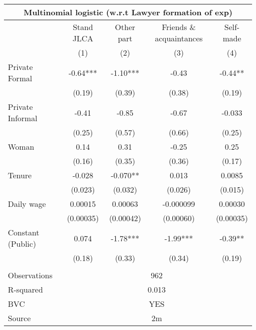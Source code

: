 \begin{tabular}{lcccc}
\multicolumn{5}{c}{Multinomial logistic (w.r.t Lawyer formation of exp)} \\
\midrule
      & Stand JLCA & Other part & Friends \& acquaintances & Self-made \\
\midrule
\midrule
      & (1)   & (2)   & (3)   & (4) \\
\midrule
\midrule
Private Formal & -0.64*** & -1.10*** & -0.43 & -0.44** \\
      & (0.19) & (0.39) & (0.38) & (0.19) \\
Private Informal & -0.41 & -0.85 & -0.67 & -0.033 \\
      & (0.25) & (0.57) & (0.66) & (0.25) \\
Woman  & 0.14  & 0.31  & -0.25 & 0.25 \\
      & (0.16) & (0.35) & (0.36) & (0.17) \\
Tenure & -0.028 & -0.070** & 0.013 & 0.0085 \\
      & (0.023) & (0.032) & (0.026) & (0.015) \\
Daily wage & 0.00015 & 0.00063 & -0.000099 & 0.00030 \\
      & (0.00035) & (0.00042) & (0.00060) & (0.00035) \\
Constant (Public) & 0.074 & -1.78*** & -1.99*** & -0.39** \\
      & (0.18) & (0.33) & (0.34) & (0.19) \\
      &       &       &       &  \\
\midrule
Observations & \multicolumn{4}{c}{962} \\
R-squared & \multicolumn{4}{c}{0.013} \\
BVC   & \multicolumn{4}{c}{YES} \\
Source & \multicolumn{4}{c}{2m} \\
\bottomrule
\bottomrule
\end{tabular}%
